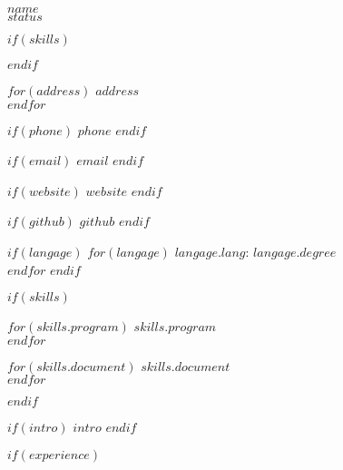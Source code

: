 \documentclass[$fontsize$, letterpaper]{article}
\begin{document}
{\Large \textbf{$name$}}\\[.14cm]
$status$

$if(skills)$
\begin{multicols}{2}
$endif$

$for(address)$
$address$\\
$endfor$


$if(phone)$
\faPhone \quad $phone$
$endif$

$if(email)$
\faEnvelope \quad \href{mailto:$email$}{$email$}
$endif$

$if(website)$
\faGlobe \quad \href{http://$website$}{$website$}
$endif$

$if(github)$
\faGithub \quad \href{https://github.com/$github$}{$github$}
$endif$

\vspace{.2cm}


$if(langage)$
$for(langage)$
\textbf{$langage.lang$}: $langage.degree$ \\
$endfor$
$endif$

$if(skills)$

\columnbreak


\vspace{-.5cm}
\begin{multicols}{2}

$for(skills.program)$
$skills.program$\\
$endfor$
\end{multicols}

\vspace{-.5cm}

\vspace{-.5cm}

\begin{multicols}{2}

$for(skills.document)$
$skills.document$\\
$endfor$


\end{multicols}
\end{multicols}
$endif$

$if(intro)$
$intro$
$endif$


$if(experience)$
\noindent
\end{document}
